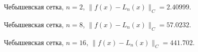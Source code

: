 \documentclass[12pt, a4paper]{article}
\begin{document}
\pagebreak


\begin{figure}[h]
    \caption{Чебышевская сетка, $n = 2$, $ \| f(x) - L_n(x)  \|_C = 2.40999 $.}
\end{figure}

\begin{figure}[h]
    \caption{Чебышевская сетка, $n = 8$, $ \| f(x) - L_n(x)  \|_C = 57.0232 $.}
\end{figure}

\pagebreak


\begin{figure}[h]
    \caption{Чебышевская сетка, $n = 16$, $ \| f(x) - L_n(x)  \|_C = 441.702 $.}
\end{figure}
\end{document}
